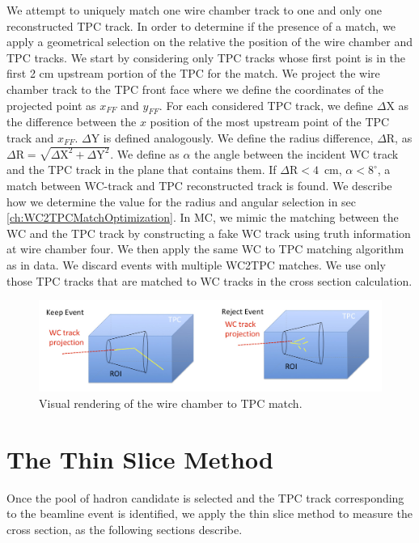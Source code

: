 We attempt to uniquely match one wire chamber track to one and only one reconstructed TPC track. 
In order to determine if the presence of a match, we apply a geometrical selection on the relative the position of the wire chamber and TPC tracks. 
We start by considering only TPC tracks whose first point is in the first 2 cm upstream portion of the TPC for the match.  We project the wire chamber track to the TPC front face where we define the coordinates of the projected point as  $x_{FF}$ and $y_{FF}$.  For each considered TPC track, we define $\Delta$X as the difference between the $x$ position of the most upstream point of the TPC track and $x_{FF}$.  $\Delta$Y is defined analogously. We define the radius difference, $\Delta$R, as $ \Delta \text{R} =  \sqrt{ \Delta \text{X}^2 +  \Delta \text{Y}^2}  $. We define  as $\alpha$ the angle between the incident WC track and the TPC track in the plane that contains them.  If  $\Delta \text{R} < 4 $~cm, $\alpha < 8^\circ $,  a match between WC-track and TPC reconstructed track is found. We describe  how we determine the value for the radius and angular selection in sec \ref{ch:WC2TPCMatchOptimization}.
In MC, we mimic the matching between the WC and the TPC track by constructing a fake WC track using truth information at wire chamber four. We then apply the same WC to TPC matching algorithm as in data. 
We discard events with multiple WC2TPC matches. We use only those TPC tracks that are matched to WC tracks in the cross section calculation.

\begin{figure}
  \centering  
\includegraphics[width=\textwidth]{Chapter-4/Images/Shower.png}
\caption{Visual rendering of the wire chamber to TPC match.}
\label{fig:showerFilt}
\end{figure}

\section{The Thin Slice Method}\label{ch:ThinSliceMethod}
Once the pool of hadron candidate is selected and the TPC track corresponding to the beamline event is identified, we apply the thin slice method to measure the cross section, as the following sections describe. 
